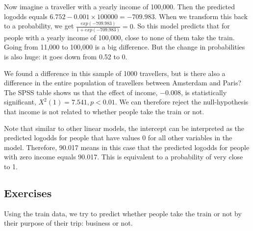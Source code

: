 \documentclass[]{report}\usepackage[]{graphicx}\usepackage[]{color}
\begin{document}
Now imagine a traveller with a yearly income of 100,000. Then the predicted logodds equals $6.752 - 0.001 \times 100000= -709.983$. When we transform this back to a probability, we get $\frac{exp(-709.983) } {1+ exp(-709.983) }= 0$. So this model predicts that for people with a yearly income of 100,000, close to none of them take the train.
Going from 11,000 to 100,000 is a big difference. But the change in probabilities is also huge: it goes down from 0.52 to 0.

We found a difference in this sample of 1000 travellers, but is there also a difference in the entire population of travellers between Amsterdam and Paris? The SPSS table shows us that the effect of income, $- 0.008$, is statistically significant, $X^2(1)=7.541, p<0.01$. We can therefore reject the null-hypothesis that income is not related to whether people take the train or not.

Note that similar to other linear models, the intercept can be interpreted as the predicted logodds for people that have values 0 for all other variables in the model. Therefore, 90.017 means in this case that the predicted logodds for people with zero income equals 90.017. This is equivalent to a probability of very close to 1.



\subsection{Exercises}

Using the train data, we try to predict whether people take the train or not by their purpose of their trip: business or not.
\end{document}
